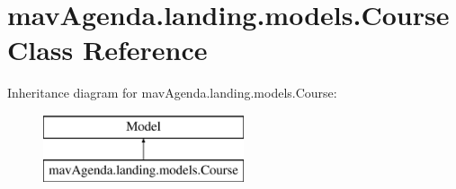 \hypertarget{classmavAgenda_1_1landing_1_1models_1_1Course}{}\section{mav\+Agenda.\+landing.\+models.\+Course Class Reference}
\label{classmavAgenda_1_1landing_1_1models_1_1Course}
Inheritance diagram for mav\+Agenda.\+landing.\+models.\+Course\+:\begin{figure}[H]
\begin{center}
\leavevmode
\includegraphics[height=2.000000cm]{classmavAgenda_1_1landing_1_1models_1_1Course}
\end{center}
\end{figure}
